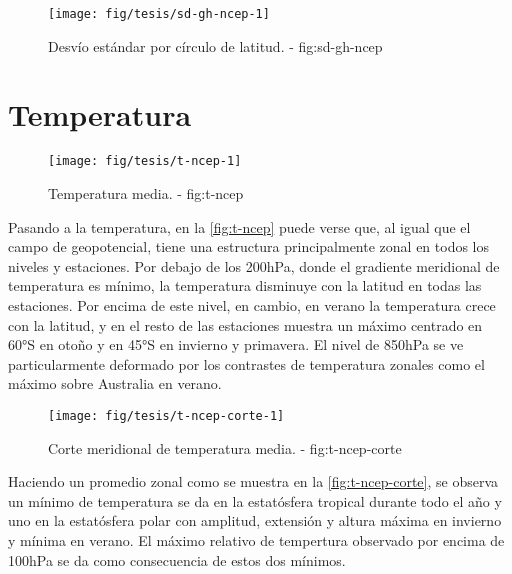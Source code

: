 \documentclass[spanish,a4paper]{book}
\begin{document}
\begin{figure}

{\centering \texttt{[image: fig/tesis/sd-gh-ncep-1]} 

}

\caption{Desvío estándar por círculo de latitud. - fig:sd-gh-ncep}\label{fig:sd-gh-ncep}
\end{figure}

\section{Temperatura}\label{temperatura}

\begin{figure}

{\centering \texttt{[image: fig/tesis/t-ncep-1]} 

}

\caption{Temperatura media. - fig:t-ncep}\label{fig:t-ncep}
\end{figure}

Pasando a la temperatura, en la \autoref{fig:t-ncep} puede verse que, al
igual que el campo de geopotencial, tiene una estructura principalmente
zonal en todos los niveles y estaciones. Por debajo de los 200hPa, donde
el gradiente meridional de temperatura es mínimo, la temperatura
disminuye con la latitud en todas las estaciones. Por encima de este
nivel, en cambio, en verano la temperatura crece con la latitud, y en el
resto de las estaciones muestra un máximo centrado en 60°S en otoño y en
45°S en invierno y primavera. El nivel de 850hPa se ve particularmente
deformado por los contrastes de temperatura zonales como el máximo sobre
Australia en verano.

\begin{figure}

{\centering \texttt{[image: fig/tesis/t-ncep-corte-1]} 

}

\caption{Corte meridional de temperatura media. - fig:t-ncep-corte}\label{fig:t-ncep-corte}
\end{figure}

Haciendo un promedio zonal como se muestra en la
\autoref{fig:t-ncep-corte}, se observa un mínimo de temperatura se da en
la estatósfera tropical durante todo el año y uno en la estatósfera
polar con amplitud, extensión y altura máxima en invierno y mínima en
verano. El máximo relativo de tempertura observado por encima de 100hPa
se da como consecuencia de estos dos mínimos.
\end{document}
